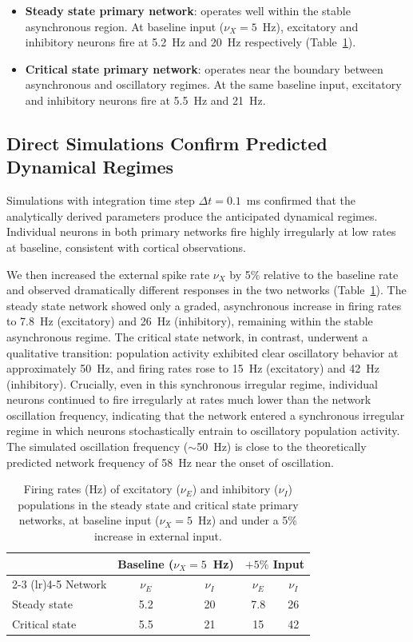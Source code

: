 \documentclass[10pt]{article}
\begin{document}
\begin{itemize}
  \item \textbf{Steady state primary network}: operates well within the
    stable asynchronous region. At baseline input ($\nu_X = 5$~Hz),
    excitatory and inhibitory neurons fire at 5.2~Hz and 20~Hz respectively
    (Table~\ref{tab:firing_rates}).
  \item \textbf{Critical state primary network}: operates near the
    boundary between asynchronous and oscillatory regimes. At the same
    baseline input, excitatory and inhibitory neurons fire at 5.5~Hz and
    21~Hz.
\end{itemize}

\subsection{Direct Simulations Confirm Predicted Dynamical Regimes}

Simulations with integration time step $\Delta t = 0.1$~ms confirmed that
the analytically derived parameters produce the anticipated dynamical
regimes. Individual neurons in both primary networks fire highly irregularly
at low rates at baseline, consistent with cortical observations.

We then increased the external spike rate $\nu_X$ by 5\% relative to the
baseline rate and observed dramatically different responses in the two
networks (Table~\ref{tab:firing_rates}). The steady state network showed
only a graded, asynchronous increase in firing rates to 7.8~Hz (excitatory)
and 26~Hz (inhibitory), remaining within the stable asynchronous regime. The
critical state network, in contrast, underwent a qualitative transition:
population activity exhibited clear oscillatory behavior at approximately
50~Hz, and firing rates rose to 15~Hz (excitatory) and 42~Hz (inhibitory).
Crucially, even in this synchronous irregular regime, individual neurons
continued to fire irregularly at rates much lower than the network oscillation
frequency, indicating that the network entered a synchronous irregular regime
in which neurons stochastically entrain to oscillatory population activity.
The simulated oscillation frequency ($\sim$50~Hz) is close to the
theoretically predicted network frequency of 58~Hz near the onset of
oscillation.

\begin{table}[htbp]
\centering
\caption{Firing rates (Hz) of excitatory ($\nu_E$) and inhibitory ($\nu_I$)
populations in the steady state and critical state primary networks, at
baseline input ($\nu_X = 5$~Hz) and under a 5\% increase in external input.}
\label{tab:firing_rates}
\begin{tabular}{lcccc}
\toprule
& \multicolumn{2}{c}{Baseline ($\nu_X = 5$~Hz)} & \multicolumn{2}{c}{$+5\%$ Input} \\
\cmidrule(lr){2-3} \cmidrule(lr){4-5}
Network & $\nu_E$ & $\nu_I$ & $\nu_E$ & $\nu_I$ \\
\midrule
Steady state & 5.2 & 20 & 7.8 & 26 \\
Critical state & 5.5 & 21 & 15 & 42 \\
\bottomrule
\end{tabular}
\end{table}
\end{document}
